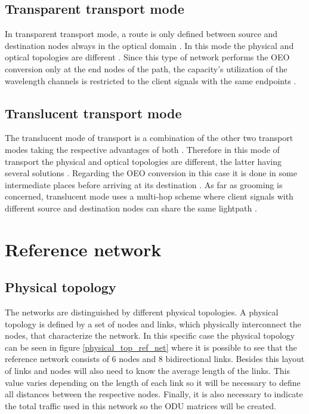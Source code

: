 \subsection{Transparent transport mode}\label{transparent}

In transparent transport mode, a route is only defined between source and destination nodes always in the optical domain \cite{book07}. In this mode the physical and optical topologies are different \cite{tesevasco}.
Since this type of network performs the OEO conversion only at the end nodes of the path, the capacity's utilization of the wavelength channels is restricted to the client signals with the same endpoints \cite{teserui,transparent}.\\

\subsection{Translucent transport mode}\label{translucent}
The translucent mode of transport is a combination of the other two transport modes taking the respective advantages of both \cite{book07}. Therefore in this mode of transport the physical and optical topologies are different, the latter having several solutions \cite{tesevasco}. Regarding the OEO conversion in this case it is done in some intermediate places before arriving at its destination \cite{teserui}.
As far as grooming is concerned, translucent mode uses a multi-hop scheme where client signals with different source and destination nodes can share the same lightpath \cite{zhu}.

\section{Reference network}\label{reference_network}

\subsection{Physical topology}\label{Reference_Network_Topology}

The networks are distinguished by different physical topologies.
A physical topology is defined by a set of nodes and links, which physically interconnect the nodes, that characterize the network.
In this specific case the physical topology can be seen in figure \ref{physical_top_ref_net} where it is possible to see that the reference network consists of 6 nodes and 8 bidirectional links.
Besides this layout of links and nodes will also need to know the average length of the links.
This value varies depending on the length of each link so it will be necessary to define all distances between the respective nodes.
Finally, it is also necessary to indicate the total traffic used in this network so the ODU matrices will be created.\\

